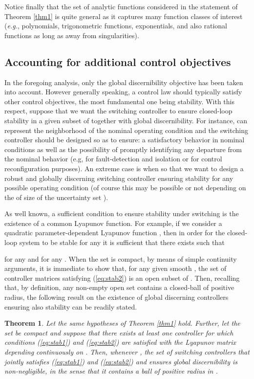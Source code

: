 \documentclass[letterpaper, 10 pt, conference]{ieeetran}
\def\qedp{\hspace*{\fill}~{\tiny }}
\newtheorem{theorem}{Theorem}
\begin{document}
Notice finally that the set of analytic functions considered in the statement of Theorem \ref{thm1} is quite general as it captures many function classes of interest 
(\emph{e.g.}, polynomials, 
trigonometric functions, exponentials, and also rational functions as long as away from singularities). 

\subsection{Accounting for additional control objectives}

In the foregoing analysis, only the global discernibility objective has been taken into account. However
generally speaking, a control law should typically satisfy other control objectives, the most fundamental one being stability.
With this respect, suppose that we want the switching controller to ensure closed-loop stability in a given subset  of  together with
global discernibility. For instance,  can represent the neighborhood of the nominal operating condition and the switching controller should
be designed so as to ensure: a satisfactory behavior in nominal conditions as well as the possibility of promptly identifying any departure from the nominal behavior (e.g, 
for fault-detection and isolation or for control reconfiguration purposes). An extreme case is when  so that we want to design a robust and globally discerning 
switching controller ensuring stability for any possible operating condition (of course this may be possible or not depending on the of size of the uncertainty set ).

As well known, a sufficient condition to ensure stability under switching is the existence of a common Lyapunov function. For example, if we consider a quadratic parameter-dependent
Lyapunov function
, then in order for the closed-loop system  to be stable for any  it is sufficient that
there exists  such that

for any  and for any . When the set  is compact, by means of simple continuity arguments, it is immediate to show
that, for any given smooth , the set of controller matrices  satisfying (\ref{eq:stab2}) is an open subset of .
Then, recalling that, by definition, any non-empty open set contains a closed-ball of positive radius, the following result on the existence of global discerning controllers ensuring also stability
can be readily stated. 

\begin{theorem} \label{thm2}
Let the same hypotheses of Theorem \ref{thm1} hold. Further, let the set  be compact and suppose that there exists at least
one controller  for which conditions (\ref{eq:stab1}) and (\ref{eq:stab2}) are satisfied with the Lyapunov matrix 
depending continuously on .
Then, whenever , the set of switching controllers   that jointly satisfies (\ref{eq:stab1}) and (\ref{eq:stab2}) and ensures global discernibility
is non-negligible, in the sense that it contains a ball of positive radius in 
. \qedp 
\end{theorem} 
\end{document}
